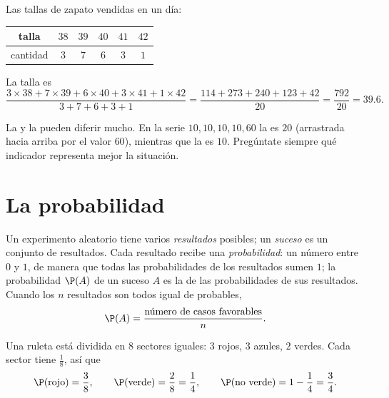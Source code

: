 \begin{example}\label{ex:g9:statproba:weighted}
Las tallas de zapato vendidas en un día:
\begin{center}
\renewcommand{\arraystretch}{1.2}
\begin{tabular}{c|ccccc}
talla & $38$ & $39$ & $40$ & $41$ & $42$ \\
\hline
cantidad & $3$ & $7$ & $6$ & $3$ & $1$ \\
\end{tabular}
\end{center}
La talla  es
\[
\frac{3 \times 38 + 7 \times 39 + 6 \times 40 + 3 \times 41 + 1 \times 42}
{3 + 7 + 6 + 3 + 1}
= \frac{114 + 273 + 240 + 123 + 42}{20}
= \frac{792}{20} = 39.6 .
\]
\end{example}

\begin{remark}
La  y la  pueden diferir mucho. En la serie
$10, 10, 10, 10, 60$ la  es $20$ (arrastrada hacia arriba por el valor $60$), mientras que
la  es $10$. Pregúntate siempre qué indicador representa mejor
la situación.
\end{remark}

\section{La probabilidad}

\begin{definition}[Probabilidad]\label{def:g9:statproba:probability}
Un experimento aleatorio tiene varios \emph{resultados} posibles; un
\emph{suceso} es un conjunto de resultados. Cada resultado recibe una
\emph{probabilidad}: un número entre $0$ y $1$,
de manera que todas las probabilidades de los resultados sumen $1$; la
probabilidad $\P(A)$ de un suceso $A$ es la  de las probabilidades de
sus resultados. Cuando los $n$ resultados son todos igual de probables,
\[
\P(A) = \frac{\text{número de casos favorables}}{n}.
\]
\end{definition}

\begin{example}\label{ex:g9:statproba:spinner}
Una ruleta está dividida en $8$ sectores iguales: $3$ rojos, $3$ azules, $2$ verdes.
Cada sector tiene  $\frac18$, así que
\[
\P(\text{rojo}) = \frac38, \qquad
\P(\text{verde}) = \frac28 = \frac14, \qquad
\P(\text{no verde}) = 1 - \frac14 = \frac34 .
\]
\end{example}

